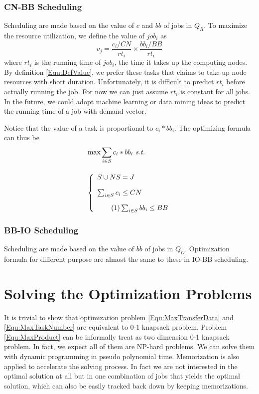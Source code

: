 \documentclass[conference,compsoc]{IEEEtran}
\newcommand\numberthis{\addtocounter{equation}{1}\tag{\theequation}}
\begin{document}
\subsubsection*{CN-BB Scheduling}
Scheduling are made based on the value of $c$ and $bb$ of jobs in $Q_R$.
To maximize the resource utilization, we define the value of $job_i$ as
\begin{equation}
        v_j = \frac{c_i / CN}{rt_i} \times \frac{bb_i / BB}{rt_i}
        \label{Equ:DefValue}
\end{equation}
where $rt_i$ is the running time of $job_i$, the time it takes up the computing nodes.
By definition \ref{Equ:DefValue}, we prefer these tasks that claims to take up node resources with short duration.
Unfortunately, it is difficult to predict $rt_i$ before actually running the job.
For now we can just assume $rt_i$ is constant for all jobs.
In the future, we could adopt machine learning or data mining ideas to predict the running time of a job with demand vector.

Notice that the value of a task is proportional to $c_i*bb_i$.
The optimizing formula can thus be
\begin{align*}
        & \max \sum_{i \in S}c_i * bb_i \textit{   s.t.}\\[1em]
        & \left\{
                \begin{array}{l}
                        S \cup NS = J \\ [1em]
                        \sum_{i \in S}c_i \leq CN \\ [1em] \numberthis \label{Equ:MaxProduct} 
                        \sum_{i\in S} bb_i \leq BB
                \end{array} 
        \right.
\end{align*}	


\subsubsection*{BB-IO Scheduling}
Scheduling are made based on the value of $bb$ of jobs in $Q_O$.
Optimization formula for different purpose are almost the same to these in IO-BB scheduling.


\section{Solving the Optimization Problems}
It is trivial to show that optimization problem \ref{Equ:MaxTransferData} and \ref{Equ:MaxTaskNumber}
are equivalent to 0-1 knapsack problem.
Problem \ref{Equ:MaxProduct} can be informally treat as two dimension 0-1 knapsack problem.
In fact, we expect all of them are NP-hard problems.
We can solve them with dynamic programming in pseudo polynomial time.
Memorization is also applied to accelerate the solving process.
In fact we are not interested in the optimal solution at all but in one combination of jobs
that yields the optimal solution, which can also be easily tracked back down by keeping memorizations.
\end{document}

